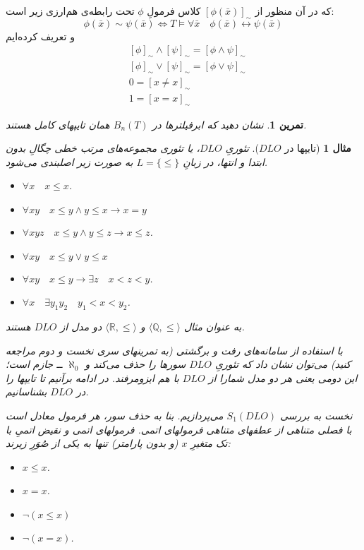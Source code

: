\documentclass[12pt,a4paper]{report}
\theoremstyle{colorhead}
\newtheorem{tam}{تمرین}
\newtheorem{mesal}[thm]{مثال}
\begin{document}
که در آن منظور از
$[\phi(\bar{x})]_\sim$
کلاس فرمولِ
$\phi$
تحت رابطه‌ی هم‌ارزی زیر است:
\[
\phi(\bar{x})\sim \psi(\bar{x})\Leftrightarrow T\models \forall \bar{x}
\quad \phi(\bar{x})\leftrightarrow \psi(\bar{x})
\]
و تعریف کرده‌ایم
\begin{align*}
& [\phi]_\sim \wedge [\psi]_\sim=[\phi\wedge\psi]_\sim\\
& [\phi]_\sim \vee [\psi]_\sim=[\phi\vee\psi]_\sim\\
& 0=[x\not=x]_\sim\\
& 1=[x=x]_\sim 
\end{align*}
\begin{tam}
نشان دهید که ابرفیلترها
در
$B_n(T)$
همان تایپهای کامل هستند.
\end{tam}
\begin{mesal}[تایپها در
$DLO$]
تئوریِ
$DLO$،
یا تئوری مجموعه‌های مرتب خطی چگالِ بدون ابتدا و انتها، در زبانِ
$L=\{\leq\}$
به صورت زیر اصلبندی می‌شود.
\begin{itemize}
\item 
$\forall x \quad x\leq x$.
\item 
$\forall xy \quad x\leq y \wedge y\leq x\to x=y$
\item 
$\forall xyz \quad x\leq y\wedge y\leq z\to x\leq z$.
\item
$\forall xy \quad x\leq y \vee y\leq x$
\item 
$\forall xy\quad x\leq y\to \exists z  \quad x<z< y$.
\item 
$\forall x\quad \exists y_1y_2 \quad y_1<x<y_2$.
\end{itemize}
به عنوان مثال
$\langle \mathbb{Q},\leq\rangle$
و
$\langle \mathbb{R},\leq\rangle$
دو مدل از 
$DLO$
هستند. 
\par 
با استفاده از سامانه‌های رفت و برگشتی (به تمرینهای سری نخست و دوم مراجعه کنید)
می‌توان نشان داد که تئوریِ
$DLO$
سورها را حذف می‌کند و
$\aleph_0$
ــ 
جازم است؛ این دومی یعنی  هر دو مدل شمارا از
$DLO$
با هم ایزومرفند. در ادامه برآنیم تا تایپها را در
$DLO$
بشناسانیم.
\par 
نخست به بررسی
$S_1(DLO)$
می‌پردازیم. بنا به حذف سور، هر فرمول معادل است با
فصلی متناهی از عطفهای متناهی فرمولهای اتمی. فرمولهای اتمی و نقیض اتمیِ
با تک متغیرِ
$x$
(و بدون پارامتر)
تنها به یکی از صُوَرِ زیرند:
\begin{itemize}
\item $x\leq x$.
\item $x=x$.
\item $\neg (x\leq x)$
\item $\neg (x=x)$.
\end{itemize}

\end{mesal}
\end{document}
